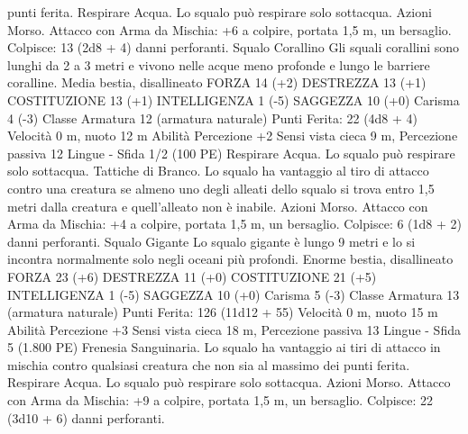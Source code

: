 \begin{multicols}{2}
punti ferita.
Respirare Acqua. Lo squalo può respirare solo sottacqua.
Azioni
Morso. Attacco con Arma da Mischia: +6 a colpire, portata 1,5
m, un bersaglio.
Colpisce: 13 (2d8 + 4) danni perforanti.
Squalo Corallino
Gli squali corallini sono lunghi da 2 a 3 metri e vivono
nelle acque meno profonde e lungo le barriere coralline.
Media bestia, disallineato
FORZA 14 (+2)
DESTREZZA 13 (+1)
COSTITUZIONE 13 (+1)
INTELLIGENZA 1 (-5)
SAGGEZZA 10 (+0)
Carisma 4 (-3)
Classe Armatura 12 (armatura naturale)
\hspace*{0pt}\hfill{Punti Ferita}: 22 (4d8 + 4)
Velocità 0 m, nuoto 12 m
Abilità Percezione +2
Sensi vista cieca 9 m, Percezione passiva 12
Lingue -
Sfida 1/2 (100 PE)
Respirare Acqua. Lo squalo può respirare solo sottacqua.
Tattiche di Branco. Lo squalo ha vantaggio al tiro di attacco
contro una creatura se almeno uno degli alleati dello squalo si
trova entro 1,5 metri dalla creatura e quell’alleato non è inabile.
Azioni
Morso. Attacco con Arma da Mischia: +4 a colpire, portata 1,5
m, un bersaglio.
Colpisce: 6 (1d8 + 2) danni perforanti.
Squalo Gigante
Lo squalo gigante è lungo 9 metri e lo si incontra
normalmente solo negli oceani più profondi.
Enorme bestia, disallineato
FORZA 23 (+6)
DESTREZZA 11 (+0)
COSTITUZIONE 21 (+5)
INTELLIGENZA 1 (-5)
SAGGEZZA 10 (+0)
Carisma 5 (-3)
Classe Armatura 13 (armatura naturale)
\hspace*{0pt}\hfill{Punti Ferita}: 126 (11d12 + 55)
Velocità 0 m, nuoto 15 m
Abilità Percezione +3
Sensi vista cieca 18 m, Percezione passiva 13
Lingue -
Sfida 5 (1.800 PE)
Frenesia Sanguinaria. Lo squalo ha vantaggio ai tiri di attacco
in mischia contro qualsiasi creatura che non sia al massimo dei
punti ferita.
Respirare Acqua. Lo squalo può respirare solo sottacqua.
Azioni
Morso. Attacco con Arma da Mischia: +9 a colpire, portata 1,5
m, un bersaglio.
Colpisce: 22 (3d10 + 6) danni perforanti.
 

\end{multicols}
